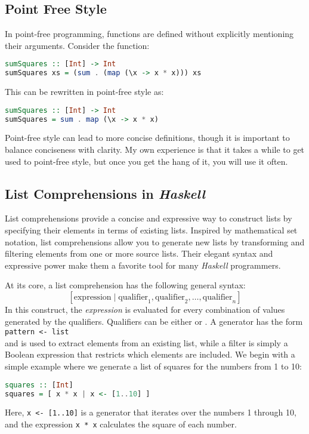 \subsection{Point Free Style}
In point-free programming, functions are defined without explicitly mentioning their arguments. Consider the function:
\begin{lstlisting}[style=haskellstyle, language=Haskell]
sumSquares :: [Int] -> Int
sumSquares xs = (sum . (map (\x -> x * x))) xs
\end{lstlisting}
This can be rewritten in point-free style as:
\begin{lstlisting}[style=haskellstyle, language=Haskell]
sumSquares :: [Int] -> Int
sumSquares = sum . map (\x -> x * x)
\end{lstlisting}
Point-free style can lead to more concise definitions, though it is important to balance conciseness with
clarity.  My own experience is that it takes a while to get used to point-free style, but once you get the hang
of it, you will use it often.

\subsection{List Comprehensions in \textsl{Haskell}}
List comprehensions provide a concise and expressive way to construct lists by specifying their elements in
terms of existing lists. Inspired by mathematical set notation, list comprehensions allow you to generate new
lists by transforming and filtering elements from one or more source lists. Their elegant syntax and expressive
power make them a favorite tool for many \textsl{Haskell} programmers. 

At its core, a list comprehension has the following general syntax:
\[
[ \text{expression} \; | \; \text{qualifier}_1, \text{qualifier}_2, \dots, \text{qualifier}_n ]
\]
In this construct, the \emph{expression} is evaluated for every combination of values generated by the
qualifiers. Qualifiers can be either   or .  A generator has the form
\\[0.2cm]
\hspace*{1.3cm}
\texttt{pattern <- list}
\\[0.2cm]
 and is used to extract elements from an existing list, while a filter is simply a
Boolean expression that restricts which elements are included. 
We begin with  a simple example where we generate a list of squares for the numbers from 1 to 10:
\begin{lstlisting}[style=haskellstyle, language=Haskell]
squares :: [Int]
squares = [ x * x | x <- [1..10] ]
\end{lstlisting}
Here, \texttt{x <- [1..10]} is a generator that iterates over the numbers 1 through 10, and the expression
\texttt{x * x} calculates the square of each number. 

